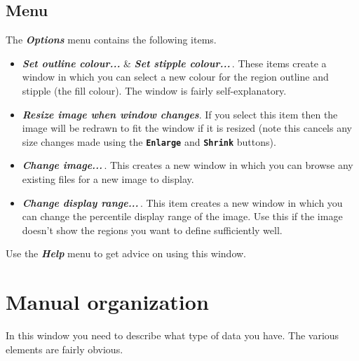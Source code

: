 \documentclass[11pt,nolof]{starlink}
\providecommand{\butt}[1]{{\bf \tt #1}}
\providecommand{\menu}[1]{{\bf \em #1}}
\begin{document}
\subsection{Menu }
The \menu{Options} menu contains the following items.
\begin{itemize}
\item \menu{Set outline colour...} \& \menu{Set stipple colour...}\,.
These items create a window in which you can select a new colour for
the region outline and stipple (the fill colour). The window is fairly
self-explanatory.
\item \menu{Resize image when window changes}.
If you select this item then the image will be redrawn to fit the window
if it is resized (note this cancels any size changes made using the
\butt{Enlarge} and \butt{Shrink} buttons).
\item \menu{Change image...}\,.
This creates a new window in which you can browse any existing files
for a new image to display.
\item \menu{Change display range...}\,.
This item creates a new window in which you can change the percentile
display range of the image. Use this if the image doesn't show the
regions you want to define sufficiently well.
\end{itemize}

Use the \menu{Help} menu to get advice on using this window.

\section{Manual organization 
         \label{CCDNDFOrganizeWindow}}

In this window you need to describe what type of data you have. The
various elements are fairly obvious.
\end{document}

